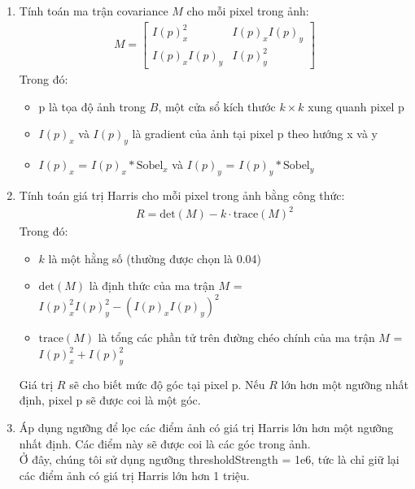 \documentclass[12pt]{article}
\begin{document}
\begin{enumerate}
    \item Tính toán ma trận covariance $M$ cho mỗi pixel trong ảnh:
        \begin{align}
        M = \begin{bmatrix} I(p)_x^2 & I(p)_x I(p)_y \\ I(p)_x I(p)_y & I(p)_y^2 \end{bmatrix}
        \end{align}
        Trong đó:
        \begin{itemize}
            \item p là tọa độ ảnh trong $B$, một cửa sổ kích thước $k \times k$ xung quanh pixel p
            \item $I(p)_x$ và $I(p)_y$ là gradient của ảnh tại pixel p theo hướng x và y
            \item $I(p)_x$ = $I(p)_x * \text{Sobel}_x$ và $I(p)_y$ = $I(p)_y * \text{Sobel}_y$
        \end{itemize} 

    \item Tính toán giá trị Harris cho mỗi pixel trong ảnh bằng công thức:
        \begin{align}
        R = \text{det}(M) - k \cdot \text{trace}(M)^2
        \end{align}
        Trong đó:
        \begin{itemize}
            \item $k$ là một hằng số (thường được chọn là 0.04)
            \item $\text{det}(M)$ là định thức của ma trận $M$ = $I(p)_x^2 I(p)_y^2 - (I(p)_x I(p)_y)^2$
            \item $\text{trace}(M)$ là tổng các phần tử trên đường chéo chính của ma trận $M$ = $I(p)_x^2 + I(p)_y^2$
        \end{itemize}
        Giá trị $R$ sẽ cho biết mức độ góc tại pixel p. Nếu $R$ lớn hơn một ngưỡng nhất định, pixel p sẽ được coi là một góc.
    
    \item Áp dụng ngưỡng để lọc các điểm ảnh có giá trị Harris lớn hơn một ngưỡng nhất định. Các điểm này sẽ được coi là các góc trong ảnh.\\
    Ở đây, chúng tôi sử dụng ngưỡng thresholdStrength = 1e6, tức là chỉ giữ lại các điểm ảnh có giá trị Harris lớn hơn 1 triệu.
    

\end{enumerate}
\end{document}
